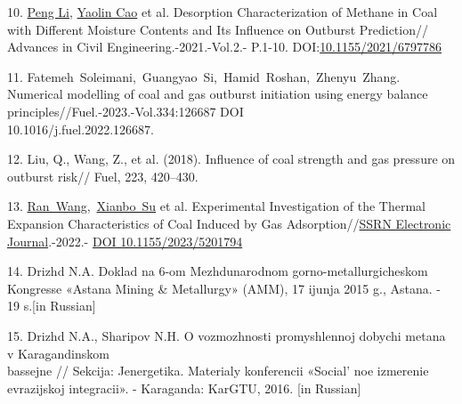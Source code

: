 \begin{references}
10. \href{https://www.researchgate.net/scientific-contributions/Peng-Li-2180480712?_tp=eyJjb250ZXh0Ijp7ImZpcnN0UGFnZSI6InB1YmxpY2F0aW9uIiwicGFnZSI6InB1YmxpY2F0aW9uIn19}{Peng
Li},
\href{https://www.researchgate.net/scientific-contributions/Yaolin-Cao-2210424180?_tp=eyJjb250ZXh0Ijp7ImZpcnN0UGFnZSI6InB1YmxpY2F0aW9uIiwicGFnZSI6InB1YmxpY2F0aW9uIn19}{Yaolin
Cao} et al. Desorption Characterization of Methane in Coal with
Different Moisture Contents and Its Influence on Outburst Prediction//
Advances in Civil Engineering.-2021.-Vol.2.- P.1-10.
DOI:\href{http://dx.doi.org/10.1155/2021/6797786}{10.1155/2021/6797786}

11. Fatemeh~Soleimani,~Guangyao~Si,~Hamid~Roshan,~Zhenyu~Zhang.
Numerical modelling of coal and gas outburst initiation using energy
balance principles//Fuel.-2023.-Vol.334:126687 DOI\\
10.1016/j.fuel.2022.126687.

12. Liu, Q., Wang, Z., et al. (2018). Influence of coal strength and gas
pressure on outburst risk// Fuel, 223, 420--430.

13. \href{https://journals.sagepub.com/doi/10.1155/2023/5201794?icid=int.sj-full-text.similar-articles.4\#con1}{Ran~Wang},~\href{https://journals.sagepub.com/doi/10.1155/2023/5201794?icid=int.sj-full-text.similar-articles.4\#con2}{Xianbo~Su}
et al. Experimental Investigation of the Thermal Expansion
Characteristics of Coal Induced by Gas
Adsorption//\href{https://www.researchgate.net/journal/SSRN-Electronic-Journal-1556-5068}{SSRN
Electronic Journal}.-2022.-
\href{https://doi.org/\%20\%20\%20DOI\%2010.1155/2023/5201794}{DOI
10.1155/2023/5201794}

14. Drizhd N.A. Doklad na 6-om Mezhdunarodnom gorno-metallurgicheskom
Kongresse «Astana Mining \& Metallurgy» (AMM), 17 ijunja 2015 g.,
Astana. - 19 s.{[}in Russian{]}

15. Drizhd N.A., Sharipov N.H. O vozmozhnosti promyshlennoj dobychi
metana v Karagandinskom \\bassejne // Sekcija: Jenergetika. Materialy
konferencii «Social' noe izmerenie evrazijskoj
integracii». - Karaganda: KarGTU, 2016. {[}in Russian{]}
\end{references}

